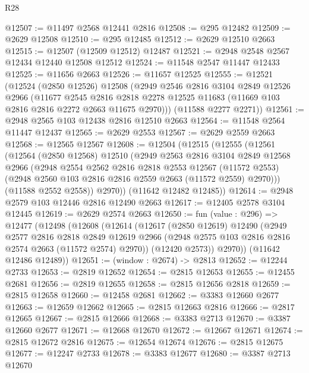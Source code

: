 \begin{lexlean}{R28}
\begin{coremodule}
@12507 := @11497 @2568 @12441 @2816
@12508 := @295 @12482
@12509 := @2629 @12508
@12510 := @295 @12485
@12512 := @2629 @12510 @2663
@12515 := @12507 (@12509 @12512) @12487
@12521 := @2948 @2548 @2567 @12434 @12440 @12508 @12512
@12524 := @11548 @2547 @11447 @12433
@12525 := @11656 @2663
@12526 := @11657 @12525
@12555 := @12521
    (@12524
      (@2850 @12526)
      @12508
      (@2949
        @2546
        @2816
        @3104
        @2849
        @12526
        @2966
        (@11677
          @2545
          @2816
          @2818
          @2278
          @12525
          @11683
          (@11669 @103 @2816 @2816 @2272 @2663 @11675 @2970)))
      (@11588 @2277 @2271))
@12561 := @2948 @2565 @103 @12438 @2816 @12510 @2663
@12564 := @11548 @2564 @11447 @12437
@12565 := @2629 @2553
@12567 := @2629 @2559 @2663
@12568 := @12565 @12567
@12608 := @12504
    (@12515
      (@12555
        (@12561
          (@12564
            (@2850 @12568)
            @12510
            (@2949
              @2563
              @2816
              @3104
              @2849
              @12568
              @2966
              (@2948
                @2554
                @2562
                @2816
                @2818
                @2553
                @12567
                (@11572 @2553)
                (@2948 @2560 @103 @2816 @2816 @2559 @2663 (@11572 @2559) @2970)))
            (@11588 @2552 @2558))
          @2970))
      (@11642 @12482 @12485))
@12614 := @2948 @2579 @103 @12446 @2816 @12490 @2663
@12617 := @12405 @2578 @3104 @12445
@12619 := @2629 @2574 @2663
@12650 := fun (value : @296) =>
  @12477
    (@12498
      (@12608
        (@12614
          (@12617
            (@2850 @12619)
            @12490
            (@2949
              @2577
              @2816
              @2818
              @2849
              @12619
              @2966
              (@2948 @2575 @103 @2816 @2816 @2574 @2663 (@11572 @2574) @2970))
            (@12420 @2573))
          @2970))
      (@11642 @12486 @12489))
@12651 := (window : @2674) -> @2813
@12652 := @12244 @2733
@12653 := @2819 @12652
@12654 := @2815 @12653
@12655 := @12455 @2681
@12656 := @2819 @12655
@12658 := @2815 @12656 @2818
@12659 := @2815 @12658
@12660 := @12458 @2681
@12662 := @3383 @12660 @2677
@12663 := @12659 @12662
@12665 := @2815 @12663 @2816
@12666 := @2817 @12665
@12667 := @2815 @12666
@12668 := @3383 @2713
@12670 := @3387 @12660 @2677
@12671 := @12668 @12670
@12672 := @12667 @12671
@12674 := @2815 @12672 @2816
@12675 := @12654 @12674
@12676 := @2815 @12675
@12677 := @12247 @2733
@12678 := @3383 @12677
@12680 := @3387 @2713 @12670

\end{coremodule}
\end{lexlean}
